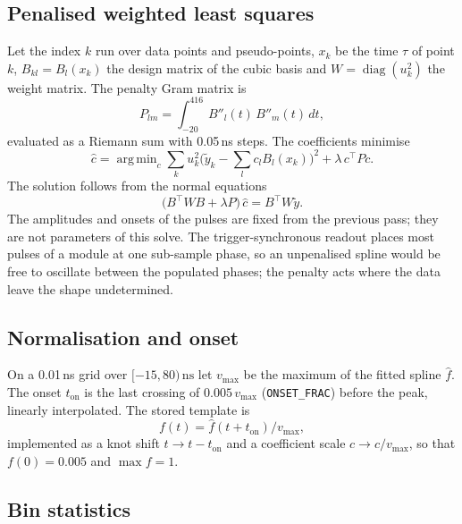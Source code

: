 \documentclass[11pt]{article}
\newcommand{\ns}{\,\mathrm{ns}}
\newcommand{\code}[1]{\texttt{#1}}
\DeclareMathOperator*{\argmin}{arg\,min}
\begin{document}
\subsection{Penalised weighted least squares}
\label{sec:lsq}

Let the index $k$ run over data points and pseudo-points, $x_k$ be the time $\tau$ of point $k$, $B_{kl} = B_l(x_k)$ the design matrix of the cubic basis and $W = \operatorname{diag}(u_k^2)$ the weight matrix. The penalty Gram matrix is
\begin{equation}
P_{lm} = \int_{-20}^{416} B''_l(t)\, B''_m(t)\, dt,
\end{equation}
evaluated as a Riemann sum with 0.05\,ns steps. The coefficients minimise
\begin{equation}
\hat c = \argmin_c \sum_k u_k^2 \Big( \tilde y_k - \sum_l c_l B_l(x_k) \Big)^2 + \lambda\, c^{\top} P c .
\end{equation}
The solution follows from the normal equations
\begin{equation}
\big( B^{\top} W B + \lambda P \big)\, \hat c = B^{\top} W \tilde y .
\label{eq:normal}
\end{equation}
The amplitudes and onsets of the pulses are fixed from the previous pass; they are not parameters of this solve. The trigger-synchronous readout places most pulses of a module at one sub-sample phase, so an unpenalised spline would be free to oscillate between the populated phases; the penalty acts where the data leave the shape undetermined.

\subsection{Normalisation and onset}
\label{sec:finalize}

On a 0.01\,ns grid over $[-15, 80)\ns$ let $v_{\max}$ be the maximum of the fitted spline $\hat f$. The onset $t_{\mathrm{on}}$ is the last crossing of $0.005\, v_{\max}$ (\code{ONSET\_FRAC}) before the peak, linearly interpolated. The stored template is
\begin{equation}
f(t) = \hat f(t + t_{\mathrm{on}}) / v_{\max},
\end{equation}
implemented as a knot shift $t \to t - t_{\mathrm{on}}$ and a coefficient scale $c \to c / v_{\max}$, so that $f(0) = 0.005$ and $\max f = 1$.

\subsection{Bin statistics}
\label{sec:bins}
\end{document}
